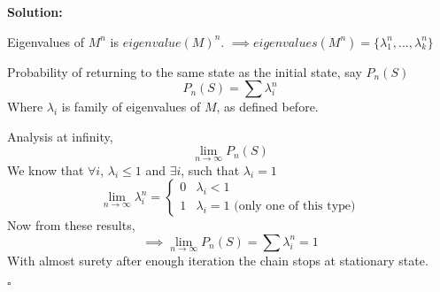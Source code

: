 \documentclass[10pt]{article}
\newenvironment{solution}{\textbf{Solution:}}{\hfill$\square$}
\begin{document}
\begin{enumerate}
\begin{solution}
\begin{enumerate}
Eigenvalues of $M^n$ is $eigenvalue(M)^n$. $\implies eigenvalues(M^n) = \{\lambda_{1}^n, ..., \lambda_{k}^n \}$ \\
\par
Probability of returning to the same state as the initial state, say $P_{n}(S)$
$$P_{n}(S) = \sum \lambda_{i}^n$$
Where $\lambda_{i}$ is family of eigenvalues of $M$, as defined before. \\
\par Analysis at infinity,
$$\lim_{n \to \infty} P_{n}(S) $$
We know that $\forall i$, $\lambda_{i} \leq 1$ and $\exists i$, such that $\lambda_{i}=1$ \\
$$\lim_{n \to \infty}\lambda_{i}^n = 
\begin{cases}
0 & \lambda_{i} < 1 \\
1 & \lambda_{i} = 1 \text{ (only one of this type)}
\end{cases}
$$
Now from these results,
$$\implies \lim_{n \to \infty} P_{n}(S) = \sum \lambda_{i}^n = 1 $$
With almost surety after enough iteration the chain stops at stationary state. 
\end{enumerate}
\end{solution}
\vspace{.1in}
\end{enumerate}
\end{document}
